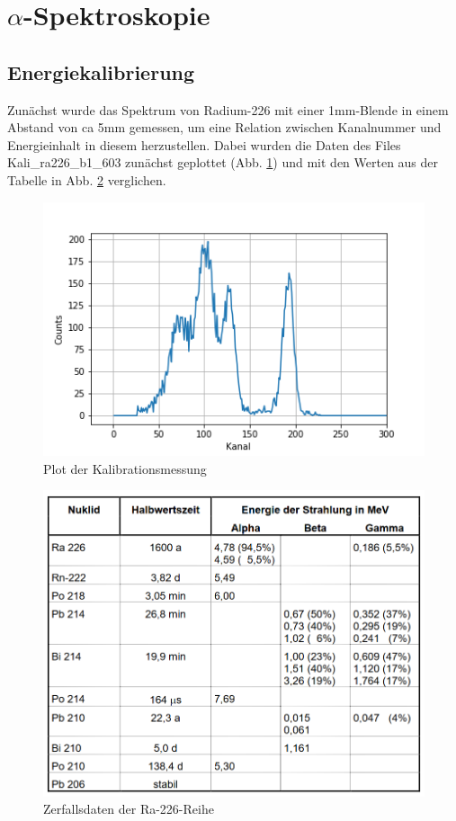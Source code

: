 

\section{$\alpha$-Spektroskopie}

\subsection{Energiekalibrierung}

Zunächst wurde das Spektrum von Radium-226 mit einer 1mm-Blende in einem Abstand von ca 5mm gemessen, um eine Relation zwischen Kanalnummer 
und Energieinhalt in diesem herzustellen. Dabei wurden die Daten des Files Kali\_ra226\_b1\_603 zunächst geplottet (Abb. \ref{bild:kali}) 
und mit den Werten aus der Tabelle in Abb. \ref{bild:TabelleRa} verglichen.

\begin{figure}[h]
    \centering
    \includegraphics[scale=0.5]{Bilder/kali.png}
    \caption{Plot der Kalibrationsmessung} %
    \label{bild:kali}
\end{figure}

\begin{figure}[h]
    \centering
    \includegraphics[scale=0.5]{Bilder/TabelleRadium.png}
    \caption{Zerfallsdaten der Ra-226-Reihe \protect \footnotemark}
    \label{bild:TabelleRa}
\end{figure}

